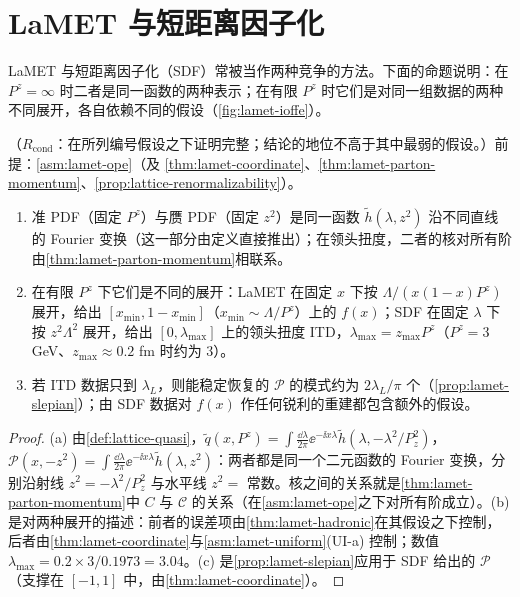 \section{LaMET 与短距离因子化}\label{sec:lamet-sdf}

LaMET 与短距离因子化（SDF）常被当作两种竞争的方法。下面的命题说明：在 $P^z=\infty$ 时二者是同一函数的两种表示；在有限 $P^z$ 时它们是对同一组数据的两种不同展开，各自依赖不同的假设（\cref{fig:lamet-ioffe}）。

\begin{proposition}\label{prop:lamet-sdf}
（$R_{\mathrm{cond}}$：在所列编号假设之下证明完整；结论的地位不高于其中最弱的假设。）前提：\cref{asm:lamet-ope}（及 \cref{thm:lamet-coordinate}、\cref{thm:lamet-parton-momentum}、\cref{prop:lattice-renormalizability}）。
\begin{enumerate}[label=(\alph*),leftmargin=2em,itemsep=1pt,topsep=2pt]
\item 准 PDF（固定 $P^z$）与赝 PDF（固定 $z^2$）是同一函数 $\tilde h(\lambda,z^2)$ 沿不同直线的 Fourier 变换（这一部分由定义直接推出）；在领头扭度，二者的核对所有阶由\cref{thm:lamet-parton-momentum}相联系。
\item 在有限 $P^z$ 下它们是不同的展开：LaMET 在固定 $x$ 下按 $\Lambda/(x(1-x)P^z)$ 展开，给出 $[x_{\min},1-x_{\min}]$（$x_{\min}\sim\Lambda/P^z$）上的 $f(x)$；SDF 在固定 $\lambda$ 下按 $z^2\Lambda^2$ 展开，给出 $[0,\lambda_{\max}]$ 上的领头扭度 ITD，$\lambda_{\max}=z_{\max}P^z$（$P^z=3$ GeV、$z_{\max}\approx0.2$ fm 时约为 $3$）。
\item 若 ITD 数据只到 $\lambda_L$，则能稳定恢复的 $\mathcal P$ 的模式约为 $2\lambda_L/\pi$ 个（\cref{prop:lamet-slepian}）；由 SDF 数据对 $f(x)$ 作任何锐利的重建都包含额外的假设。
\end{enumerate}
\end{proposition}

\begin{proof}
(a) 由\cref{def:lattice-quasi}，$\tilde q(x,P^z)=\int\frac{\dd\lambda}{2\pi}\ee^{-\ii x\lambda}\tilde h(\lambda,-\lambda^2/P_z^2)$，$\mathcal P(x,-z^2)=\int\frac{\dd\lambda}{2\pi}\ee^{-\ii x\lambda}\tilde h(\lambda,z^2)$：两者都是同一个二元函数的 Fourier 变换，分别沿射线 $z^2=-\lambda^2/P_z^2$ 与水平线 $z^2=$ 常数。核之间的关系就是\cref{thm:lamet-parton-momentum}中 $C$ 与 $\mathcal C$ 的关系（在\cref{asm:lamet-ope}之下对所有阶成立）。(b) 是对两种展开的描述：前者的误差项由\cref{thm:lamet-hadronic}在其假设之下控制，后者由\cref{thm:lamet-coordinate}与\cref{asm:lamet-uniform}(UI-a) 控制；数值 $\lambda_{\max}=0.2\times3/0.1973=3.04$。(c) 是\cref{prop:lamet-slepian}应用于 SDF 给出的 $\mathcal P$（支撑在 $[-1,1]$ 中，由\cref{thm:lamet-coordinate}）。
\end{proof}

